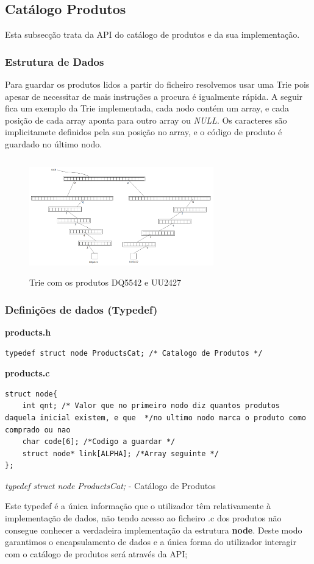\documentclass[10pt] {article}
\begin{document}

\newpage
\subsection{Catálogo Produtos}
\par Esta subsecção trata da API do catálogo de produtos e da sua implementação.

\subsubsection{Estrutura de Dados}
\par
Para guardar os produtos lidos a partir do ficheiro resolvemos usar uma Trie pois apesar de necessitar de mais instruções a procura é igualmente rápida. A seguir fica um exemplo da Trie implementada, cada nodo contém um array, e cada posição de cada array aponta para outro array ou \emph{NULL}. Os caracteres são implicitamete definidos pela sua posição no array, e o código de produto é guardado no último nodo.


\begin{figure}[ht!]
\centering
\includegraphics[width=80mm, height=50mm]{trie2.png}
\caption{Trie com os produtos DQ5542 e UU2427}
\end{figure}

\subsubsection{Definições de dados (Typedef)}

\textbf{products.h}
\begin{lstlisting}
typedef struct node ProductsCat; /* Catalogo de Produtos */
\end{lstlisting}
\textbf{products.c}
\begin{lstlisting}
struct node{
	int qnt; /* Valor que no primeiro nodo diz quantos produtos daquela inicial existem, e que  */no ultimo nodo marca o produto como comprado ou nao
	char code[6]; /*Codigo a guardar */
	struct node* link[ALPHA]; /*Array seguinte */
};
\end{lstlisting}
\emph{typedef struct node ProductsCat;} - Catálogo de Produtos
\par Este typedef é a única informação que o utilizador têm relativamente à implementação de dados, não tendo
acesso ao ficheiro .c dos produtos não consegue conhecer a verdadeira implementação da estrutura \textbf{node}.
Deste modo garantimos o encapsulamento de dados e a única forma do utilizador interagir com o catálogo de
produtos será através da API;
\end{document}
